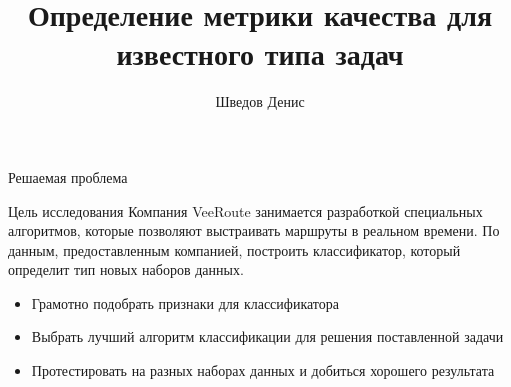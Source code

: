 \documentclass{beamer}
\title[Метрика качества]{Определение метрики качества для известного типа задач}
\author[Шведов Денис]{Шведов Денис}
\institute[]{Национальный исследовательский университет информационных технологий, механики и оптики}
\date{}
\begin{document}



\begin{frame}{Решаемая проблема}
\begin{block}{Цель исследования}
Компания VeeRoute занимается разработкой специальных алгоритмов, которые позволяют выстраивать маршруты в реальном времени.	
По данным, предоставленным компанией, построить классификатор, который определит тип новых наборов данных. 
\begin{itemize}
\item Грамотно подобрать признаки для классификатора
\item Выбрать лучший алгоритм классификации для решения поставленной задачи
\item Протестировать на разных наборах данных и добиться хорошего результата
\end{itemize}
\end{block}
\end{frame}
\end{document}
